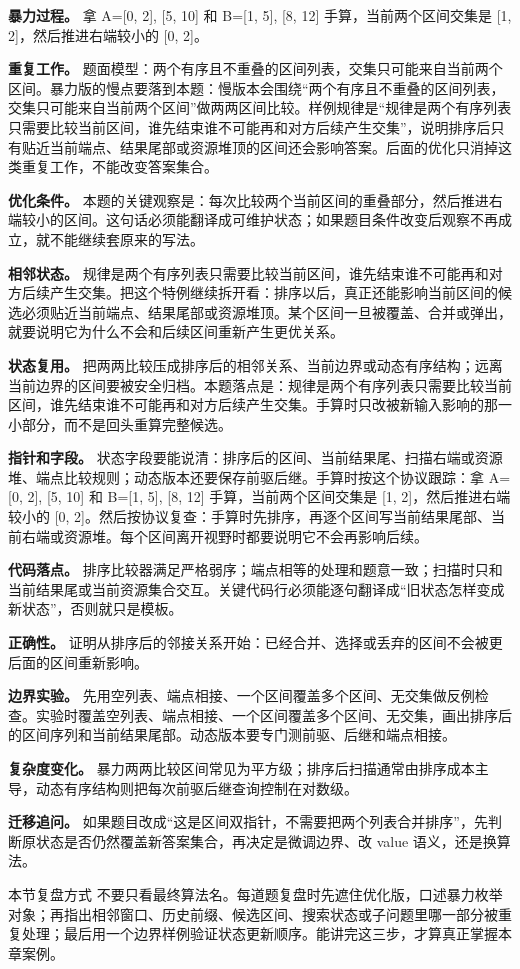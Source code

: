 \textbf{暴力过程。} 拿 A=[0, 2], [5, 10] 和 B=[1, 5], [8, 12] 手算，当前两个区间交集是 [1, 2]，然后推进右端较小的 [0, 2]。

\textbf{重复工作。} 题面模型：两个有序且不重叠的区间列表，交集只可能来自当前两个区间。暴力版的慢点要落到本题：慢版本会围绕“两个有序且不重叠的区间列表，交集只可能来自当前两个区间”做两两区间比较。样例规律是“规律是两个有序列表只需要比较当前区间，谁先结束谁不可能再和对方后续产生交集”，说明排序后只有贴近当前端点、结果尾部或资源堆顶的区间还会影响答案。后面的优化只消掉这类重复工作，不能改变答案集合。

\textbf{优化条件。} 本题的关键观察是：每次比较两个当前区间的重叠部分，然后推进右端较小的区间。这句话必须能翻译成可维护状态；如果题目条件改变后观察不再成立，就不能继续套原来的写法。

\textbf{相邻状态。} 规律是两个有序列表只需要比较当前区间，谁先结束谁不可能再和对方后续产生交集。把这个特例继续拆开看：排序以后，真正还能影响当前区间的候选必须贴近当前端点、结果尾部或资源堆顶。某个区间一旦被覆盖、合并或弹出，就要说明它为什么不会和后续区间重新产生更优关系。

\textbf{状态复用。} 把两两比较压成排序后的相邻关系、当前边界或动态有序结构；远离当前边界的区间要被安全归档。本题落点是：规律是两个有序列表只需要比较当前区间，谁先结束谁不可能再和对方后续产生交集。手算时只改被新输入影响的那一小部分，而不是回头重算完整候选。

\textbf{指针和字段。} 状态字段要能说清：排序后的区间、当前结果尾、扫描右端或资源堆、端点比较规则；动态版本还要保存前驱后继。手算时按这个协议跟踪：拿 A=[0, 2], [5, 10] 和 B=[1, 5], [8, 12] 手算，当前两个区间交集是 [1, 2]，然后推进右端较小的 [0, 2]。然后按协议复查：手算时先排序，再逐个区间写当前结果尾部、当前右端或资源堆。每个区间离开视野时都要说明它不会再影响后续。

\textbf{代码落点。} 排序比较器满足严格弱序；端点相等的处理和题意一致；扫描时只和当前结果尾或当前资源集合交互。关键代码行必须能逐句翻译成“旧状态怎样变成新状态”，否则就只是模板。

\textbf{正确性。} 证明从排序后的邻接关系开始：已经合并、选择或丢弃的区间不会被更后面的区间重新影响。

\textbf{边界实验。} 先用空列表、端点相接、一个区间覆盖多个区间、无交集做反例检查。实验时覆盖空列表、端点相接、一个区间覆盖多个区间、无交集，画出排序后的区间序列和当前结果尾部。动态版本要专门测前驱、后继和端点相接。

\textbf{复杂度变化。} 暴力两两比较区间常见为平方级；排序后扫描通常由排序成本主导，动态有序结构则把每次前驱后继查询控制在对数级。

\textbf{迁移追问。} 如果题目改成“这是区间双指针，不需要把两个列表合并排序”，先判断原状态是否仍然覆盖新答案集合，再决定是微调边界、改 value 语义，还是换算法。

\begin{principlebox}{本节复盘方式}
不要只看最终算法名。每道题复盘时先遮住优化版，口述暴力枚举对象；再指出相邻窗口、历史前缀、候选区间、搜索状态或子问题里哪一部分被重复处理；最后用一个边界样例验证状态更新顺序。能讲完这三步，才算真正掌握本章案例。
\end{principlebox}
